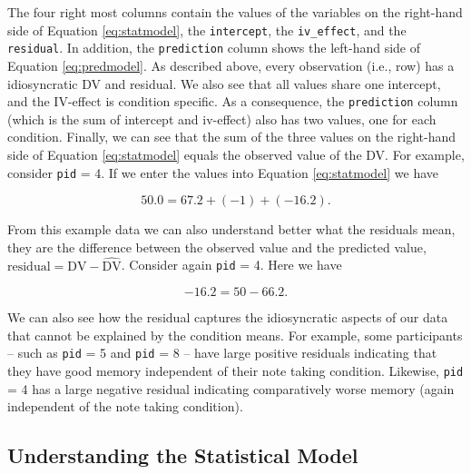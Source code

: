 \documentclass[
]{book}
\begin{document}
The four right most columns contain the values of the variables on the right-hand side of Equation \eqref{eq:statmodel}, the \texttt{intercept}, the \texttt{iv\_effect}, and the \texttt{residual}. In addition, the \texttt{prediction} column shows the left-hand side of Equation \eqref{eq:predmodel}. As described above, every observation (i.e., row) has a idiosyncratic DV and residual. We also see that all values share one intercept, and the IV-effect is condition specific. As a consequence, the \texttt{prediction} column (which is the sum of intercept and iv-effect) also has two values, one for each condition. Finally, we can see that the sum of the three values on the right-hand side of Equation \eqref{eq:statmodel} equals the observed value of the DV. For example, consider \texttt{pid} = 4. If we enter the values into Equation \eqref{eq:statmodel} we have

\[
50.0 = 67.2 + (-1) + (-16.2).
\]

From this example data we can also understand better what the residuals mean, they are the difference between the observed value and the predicted value, \(\text{residual} = \text{DV} - \hat{\text{DV}}\). Consider again \texttt{pid} = 4. Here we have

\[
-16.2 = 50- 66.2.
\]

We can also see how the residual captures the idiosyncratic aspects of our data that cannot be explained by the condition means. For example, some participants -- such as \texttt{pid} = 5 and \texttt{pid} = 8 -- have large positive residuals indicating that they have good memory independent of their note taking condition. Likewise, \texttt{pid} = 4 has a large negative residual indicating comparatively worse memory (again independent of the note taking condition).

\hypertarget{understanding-the-statistical-model}{%
\subsection{Understanding the Statistical Model}\label{understanding-the-statistical-model}}
\end{document}

